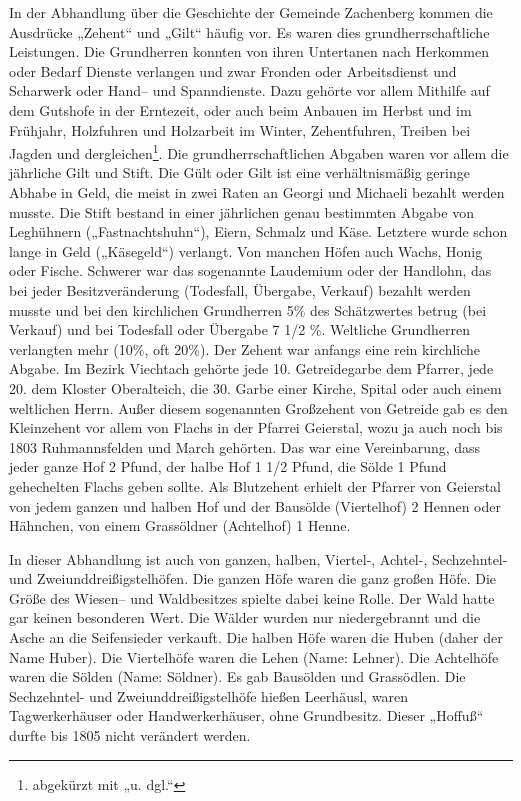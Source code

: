\documentclass{book}
\begin{document}
In der Abhandlung über die Geschichte der Gemeinde Zachenberg kommen die
Ausdrücke „Zehent“ und „Gilt“ häufig vor. Es waren dies
grundherrschaftliche Leistungen. Die Grundherren konnten von ihren
Untertanen nach Herkommen oder Bedarf Dienste verlangen und zwar Fronden
oder Arbeitsdienst und Scharwerk oder Hand– und Spanndienste. Dazu
gehörte vor allem Mithilfe auf dem Gutshofe in der Erntezeit, oder auch
beim Anbauen im Herbst und im Frühjahr, Holzfuhren und Holzarbeit im
Winter, Zehentfuhren, Treiben bei Jagden und
dergleichen\footnote{abgekürzt mit „u. dgl.“}. Die grundherrschaftlichen
Abgaben waren vor allem die jährliche Gilt und Stift. Die Gült oder Gilt
ist eine verhältnismäßig geringe Abhabe in Geld, die meist in zwei Raten
an Georgi und Michaeli bezahlt werden musste. Die Stift bestand in einer
jährlichen genau bestimmten Abgabe von Leghühnern („Fastnachtshuhn“),
Eiern, Schmalz und Käse. Letztere wurde schon lange in Geld („Käsegeld“)
verlangt. Von manchen Höfen auch Wachs, Honig oder Fische. Schwerer war
das sogenannte Laudemium oder der Handlohn, das bei jeder
Besitzveränderung (Todesfall, Übergabe, Verkauf) bezahlt werden musste
und bei den kirchlichen Grundherren 5\% des Schätzwertes betrug (bei
Verkauf) und bei Todesfall oder Übergabe 7 1/2 \%. Weltliche Grundherren
verlangten mehr (10\%, oft 20\%). Der Zehent war anfangs eine rein
kirchliche Abgabe. Im Bezirk Viechtach gehörte jede 10. Getreidegarbe
dem Pfarrer, jede 20. dem Kloster Oberalteich, die 30. Garbe einer
Kirche, Spital oder auch einem weltlichen Herrn. Außer diesem
sogenannten Großzehent von Getreide gab es den Kleinzehent vor allem von
Flachs in der Pfarrei Geierstal, wozu ja auch noch bis 1803
Ruhmannsfelden und March gehörten. Das war eine Vereinbarung, dass jeder
ganze Hof 2 Pfund, der halbe Hof 1 1/2 Pfund, die Sölde 1 Pfund
gehechelten Flachs geben sollte. Als Blutzehent erhielt der Pfarrer von
Geierstal von jedem ganzen und halben Hof und der Bausölde (Viertelhof)
2 Hennen oder Hähnchen, von einem Grassöldner (Achtelhof) 1 Henne.

In dieser Abhandlung ist auch von ganzen, halben, Viertel-, Achtel-,
Sechzehntel- und Zweiunddreißigstelhöfen. Die ganzen Höfe waren die ganz
großen Höfe. Die Größe des Wiesen– und Waldbesitzes spielte dabei keine
Rolle. Der Wald hatte gar keinen besonderen Wert. Die Wälder wurden nur
niedergebrannt und die Asche an die Seifensieder verkauft. Die halben
Höfe waren die Huben (daher der Name Huber). Die Viertelhöfe waren die
Lehen (Name: Lehner). Die Achtelhöfe waren die Sölden (Name: Söldner).
Es gab Bausölden und Grassödlen. Die Sechzehntel- und
Zweiunddreißigstelhöfe hießen Leerhäusl, waren Tagwerkerhäuser oder
Handwerkerhäuser, ohne Grundbesitz. Dieser „Hoffuß“ durfte bis 1805
nicht verändert werden.
\end{document}
